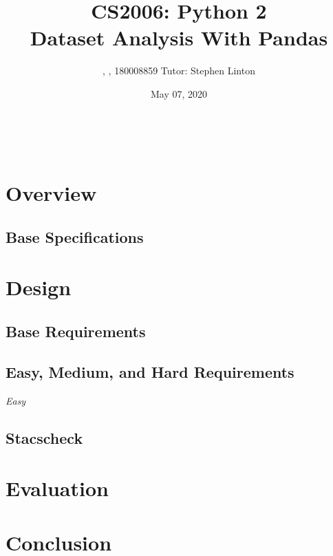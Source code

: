 \documentclass[12pt,a4paper,final]{article}
\begin{document}
\title{%
    CS2006: Python 2 \\
    \Large Dataset Analysis With Pandas} \\
\author{, , 180008859 Tutor: Stephen Linton}
\date{May 07, 2020}
\maketitle

\section*{Overview}

\subsection*{Base Specifications}

\begin{itemize}[noitemsep]

\end{itemize}

\section*{Design}

\subsection*{Base Requirements}

\subsection*{Easy, Medium, and Hard Requirements}
\begin{center} \emph{Easy} \end{center}
\begin{itemize}[noitemsep]
\end{itemize}


\subsection*{Stacscheck}

\section*{Evaluation}

\section*{Conclusion}
\end{document}
